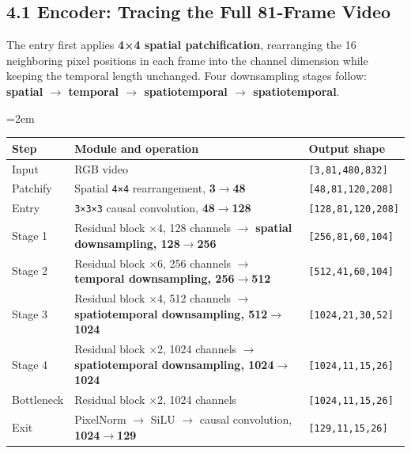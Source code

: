 \documentclass[
  11pt,
  a4paper,
]{article}
\newcounter{none} %
\newcommand{\NotesTableStyle}{\linespread{1}\fontsize{9.5pt}{13pt}\selectfont\setlength{\tabcolsep}{4pt}\renewcommand{\arraystretch}{1.1}\setlength{\extrarowheight}{5pt}\setlength{\LTpre}{5pt}\setlength{\LTpost}{6pt}\setlength{\parskip}{0pt}\emergencystretch=2em}
\begin{document}

\subsection{4.1 Encoder: Tracing the Full 81-Frame
Video}\label{ltx25-encoder}

The entry first applies \textbf{4×4 spatial patchification}, rearranging
the 16 neighboring pixel positions in each frame into the channel
dimension while keeping the temporal length unchanged. Four downsampling
stages follow: \textbf{spatial \(\rightarrow\) temporal \(\rightarrow\)
spatiotemporal \(\rightarrow\) spatiotemporal}.

\begingroup\NotesTableStyle\fontsize{10pt}{12pt}\selectfont\renewcommand{\arraystretch}{1.02}\setlength{\extrarowheight}{1pt}

{\def\LTcaptype{none} %
\begin{longtable}[]{@{}
  >{\raggedright\arraybackslash}p{}
  >{\raggedright\arraybackslash}p{}
  >{\raggedright\arraybackslash}p{}@{}}
\toprule\noalign{}
\begin{minipage}[b]{\linewidth}\raggedright
Step
\end{minipage} & \begin{minipage}[b]{\linewidth}\raggedright
Module and operation
\end{minipage} & \begin{minipage}[b]{\linewidth}\raggedright
Output shape
\end{minipage} \\
\midrule\noalign{}
\endhead
\bottomrule\noalign{}
\endlastfoot
Input & RGB video & \texttt{{[}3,81,480,832{]}} \\
Patchify & Spatial \texttt{4×4} rearrangement,
\textbf{3\(\rightarrow\)48} & \texttt{{[}48,81,120,208{]}} \\
Entry & \texttt{3×3×3} causal convolution, \textbf{48\(\rightarrow\)128}
& \texttt{{[}128,81,120,208{]}} \\
Stage 1 & Residual block ×4, 128 channels \(\rightarrow\)
\textbf{spatial downsampling, 128\(\rightarrow\)256} &
\texttt{{[}256,81,60,104{]}} \\
Stage 2 & Residual block ×6, 256 channels \(\rightarrow\)
\textbf{temporal downsampling, 256\(\rightarrow\)512} &
\texttt{{[}512,41,60,104{]}} \\
Stage 3 & Residual block ×4, 512 channels \(\rightarrow\)
\textbf{spatiotemporal downsampling, 512\(\rightarrow\)1024} &
\texttt{{[}1024,21,30,52{]}} \\
Stage 4 & Residual block ×2, 1024 channels \(\rightarrow\)
\textbf{spatiotemporal downsampling, 1024\(\rightarrow\)1024} &
\texttt{{[}1024,11,15,26{]}} \\
Bottleneck & Residual block ×2, 1024 channels &
\texttt{{[}1024,11,15,26{]}} \\
Exit & PixelNorm \(\rightarrow\) SiLU \(\rightarrow\) causal
convolution, \textbf{1024\(\rightarrow\)129} &
\texttt{{[}129,11,15,26{]}} \\
\end{longtable}
}
\end{document}
